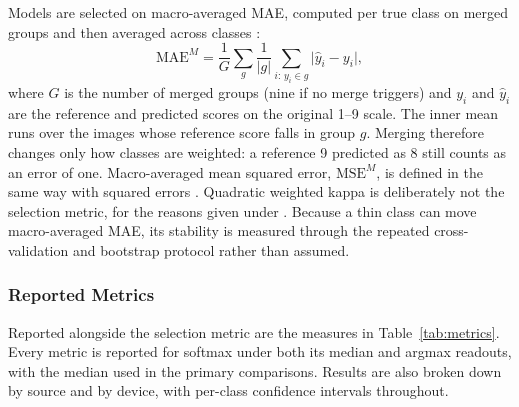 \documentclass{icsthesis}
\newcommand{\secref}[1]{\textit{\nameref{#1}}}
\begin{document}
\begin{mainmatter}
					Models are selected on macro-averaged MAE, computed per true class on merged
					groups and then averaged across classes \citep{baccianella2009}:
					\[
						\mathrm{MAE}^{M} = \frac{1}{G} \sum_{g} \frac{1}{|g|} \sum_{i:\, y_i \in g}
						\lvert \hat{y}_i - y_i \rvert,
					\]
					where $G$ is the number of merged groups (nine if no merge triggers) and $y_i$
					and $\hat{y}_i$ are the reference and predicted scores on the original 1--9
					scale. The inner mean runs over the images whose reference score falls in group
					$g$. Merging therefore changes only how classes are weighted: a reference 9
					predicted as 8 still counts as an error of one. Macro-averaged mean squared
					error, $\mathrm{MSE}^{M}$, is defined in the same way with squared errors
					\citep{baccianella2009}. Quadratic weighted kappa is deliberately not the selection metric, for the reasons given under \secref{sec:evalmethods}. Because a thin class can move macro-averaged MAE, its stability is measured through the repeated cross-validation and bootstrap protocol rather than assumed.

				\subsubsection{Reported Metrics}\label{sec:metrics}

					Reported alongside the selection metric are the measures in
					Table~\ref{tab:metrics}. Every metric is reported for softmax under both
					its median and argmax readouts, with the median used in the primary
					comparisons. Results are also broken down by source and by device, with
					per-class confidence intervals throughout.


\end{mainmatter}
\end{document}
